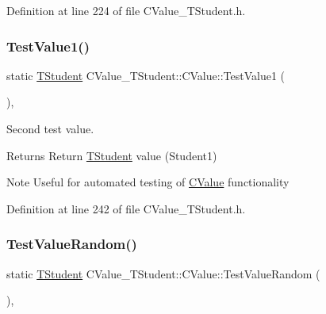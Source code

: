 Definition at line 224 of file C\+Value\+\_\+\+T\+Student.\+h.

\mbox{\label{class_c_value___t_student_1_1_c_value_a41c8aac60fd9651de611ce2220d3f352}} 
\subsubsection{\texorpdfstring{Test\+Value1()}{TestValue1()}}
{\footnotesize\ttfamily static \hyperlink{struct_c_value___t_student_1_1_t_student}{T\+Student} C\+Value\+\_\+\+T\+Student\+::\+C\+Value\+::\+Test\+Value1 (\begin{DoxyParamCaption}{ }\end{DoxyParamCaption})\hspace{0.3cm}{\ttfamily [inline]}, {\ttfamily [static]}}



Second test value. 

\begin{DoxyReturn}{Returns}
Return \hyperlink{struct_c_value___t_student_1_1_t_student}{T\+Student} value (Student1) 
\end{DoxyReturn}
\begin{DoxyNote}{Note}
Useful for automated testing of \hyperlink{class_c_value___t_student_1_1_c_value}{C\+Value} functionality 
\end{DoxyNote}


Definition at line 242 of file C\+Value\+\_\+\+T\+Student.\+h.

\mbox{\label{class_c_value___t_student_1_1_c_value_a86cd62d595805bfaaa99c7519fddff21}} 
\subsubsection{\texorpdfstring{Test\+Value\+Random()}{TestValueRandom()}}
{\footnotesize\ttfamily static \hyperlink{struct_c_value___t_student_1_1_t_student}{T\+Student} C\+Value\+\_\+\+T\+Student\+::\+C\+Value\+::\+Test\+Value\+Random (\begin{DoxyParamCaption}{ }\end{DoxyParamCaption})\hspace{0.3cm}{\ttfamily [inline]}, {\ttfamily [static]}}



